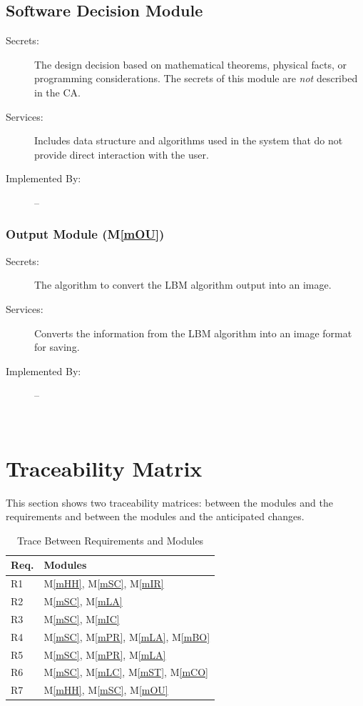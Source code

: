 \documentclass[12pt, titlepage]{article}
\newcommand{\mref}[1]{M\ref{#1}}
\begin{document}
\subsection{Software Decision Module}

\begin{description}
\item[Secrets:] The design decision based on mathematical theorems, physical
  facts, or programming considerations. The secrets of this module are
  \emph{not} described in the CA.
\item[Services:] Includes data structure and algorithms used in the system that
  do not provide direct interaction with the user. 
\item[Implemented By:] --
\end{description}

\subsubsection{Output Module (\mref{mOU})}

\begin{description}
	\item[Secrets:] The algorithm to convert the LBM algorithm output into an image.
	\item[Services:] Converts the information from the LBM algorithm into an image format for saving.
	\item[Implemented By:] --
\end{description}

~\newpage

\section{Traceability Matrix} \label{SecTM}

This section shows two traceability matrices: between the modules and the
requirements and between the modules and the anticipated changes.

\begin{table}[H]
\centering
\begin{tabular}{p{} p{}}
\toprule
\textbf{Req.} & \textbf{Modules}\\
\midrule
R1 & \mref{mHH}, \mref{mSC}, \mref{mIR}\\
R2 & \mref{mSC}, \mref{mLA}\\
R3 & \mref{mSC}, \mref{mIC}\\
R4 & \mref{mSC}, \mref{mPR}, \mref{mLA}, \mref{mBO}\\
R5 & \mref{mSC}, \mref{mPR}, \mref{mLA}\\
R6 & \mref{mSC}, \mref{mLC}, \mref{mST}, \mref{mCO}\\
R7 & \mref{mHH}, \mref{mSC}, \mref{mOU}\\
\bottomrule
\end{tabular}
\caption{Trace Between Requirements and Modules}
\label{TblRT}
\end{table}
\end{document}
